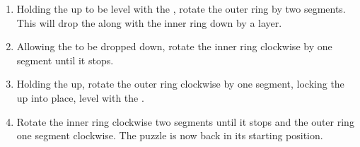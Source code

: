 \documentclass{article}
\begin{document}
\begin{enumerate}
            This raises the \vhalf{} up a layer.
      \item Holding the \vhalf{} up to be level with the \hhalf{}, rotate the outer ring \cc{} by two segments.
            This will drop the \hhalf{} along with the inner ring down by a layer.
      \item Allowing the \hhalf{} to be dropped down, rotate the inner ring clockwise by one segment until it stops.
      \item Holding the \hhalf{} up, rotate the outer ring clockwise by one segment, locking the \hhalf{} up into place, level with the \vhalf{}.
      \item Rotate the inner ring clockwise two segments until it stops and the outer ring one segment clockwise.
            The puzzle is now back in its starting position.
\end{enumerate}
\end{document}
